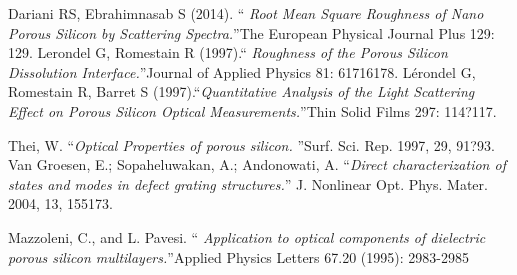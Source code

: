 \documentclass{article}
\begin{document}
\begin{thebibliography}{XX}
 Dariani RS, Ebrahimnasab S (2014). \textquotedblleft
  \emph{Root Mean Square Roughness of Nano Porous Silicon by
    Scattering Spectra.}\textquotedblright The
  European Physical Journal Plus 129: 129.
 Lerondel G, Romestain R (1997).\textquotedblleft
  \emph{Roughness of the Porous Silicon Dissolution
    Interface.}\textquotedblright Journal of Applied Physics 81:
  61716178.
 Lérondel G, Romestain R, Barret S
  (1997).\textquotedblleft \emph{Quantitative Analysis of the Light
    Scattering Effect on Porous Silicon
    Optical Measurements.}\textquotedblright Thin Solid Films 297:
  114?117.

 Thei, W. \textquotedblleft \emph{Optical Properties of porous silicon.}
\textquotedblright Surf. Sci. Rep. 1997, 29, 91?93.
 Van Groesen, E.; Sopaheluwakan, A.; Andonowati,
  A. \textquotedblleft  \emph{Direct characterization of states and
    modes in defect grating structures.}\textquotedblright
  J. Nonlinear Opt. Phys. Mater. 2004, 13, 155173.

 Mazzoleni, C., and L. Pavesi. \textquotedblleft
  \emph{Application to optical components of dielectric porous silicon
    multilayers.}\textquotedblright Applied Physics Letters 67.20
  (1995): 2983-2985

\end{thebibliography}
\end{document}
